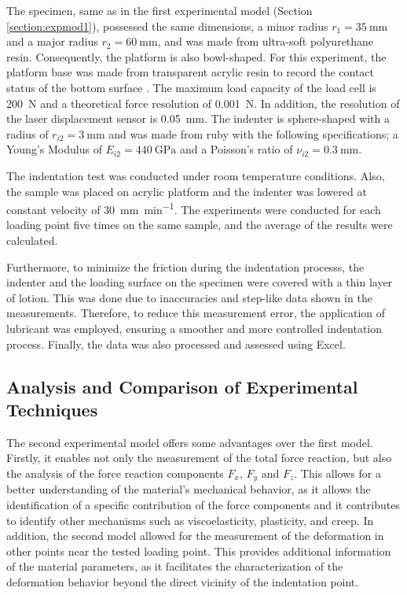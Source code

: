 The specimen, same as in the first experimental model (Section \ref{section:expmod1}),
 possessed the same dimensions, a minor radius $r_1 = \SI{35}{\milli \m}$ and a major 
 radius $r_2 = \SI{60}{\milli \m}$, and was
made from ultra-soft polyurethane resin. Consequently, the platform is also 
bowl-shaped. For this experiment, the platform base was made from transparent 
acrylic resin to record the contact status of the bottom surface \cite{Mori2022}. 
The maximum load capacity of the load cell is \SI{200}{\newton} and a theoretical 
force resolution of \SI{0.001}{\newton}. In addition, the resolution of the 
laser displacement sensor is \SI{0.05}{\milli \m}.
The indenter is sphere-shaped with a radius of $r_{i2} = \SI{3}{\milli \m}$ and
was made from ruby with the following specifications; 
a Young's Modulus of $E_{i2} = \SI{440}{\giga \pascal}$ and a Poisson's ratio of 
$\nu_{i2} = \SI{0.3}{\milli \m}$.

The indentation test was conducted under room temperature conditions. Also, 
the sample was placed on acrylic platform and the indenter was 
lowered at constant velocity of \SI[per-mode = symbol]{30}{\milli \m\per \minute}. 
The experiments were conducted for each loading point five times on the same sample, 
and the average of the results were calculated.

Furthermore, to minimize the friction during the indentation processs, the indenter 
and the loading surface on the specimen were covered with a thin layer of lotion. 
This was done due to inaccuracies and step-like data shown in the measurements. Therefore, to reduce 
this measurement error, the application of lubricant was employed, ensuring a 
smoother and more controlled indentation process. Finally, the data 
was also processed and assessed using Excel.

\subsection*{Analysis and Comparison of Experimental Techniques}

The second experimental model offers some advantages over the first model. 
Firstly, it enables not only the measurement of the total force reaction, but also the analysis 
of the force reaction components $F_x$, $F_y$ and $F_z$. This allows for a better 
understanding of the material's mechanical behavior, as it allows the identification 
of a specific contribution of the force components and it contributes to identify other 
mechanisms such as viscoelasticity, plasticity, and creep. 
In addition, the second model allowed for the measurement of the deformation in other 
points near the tested loading point. This provides additional information of the 
material parameters, as it facilitates the characterization of the deformation behavior beyond the 
direct vicinity of the indentation point.

